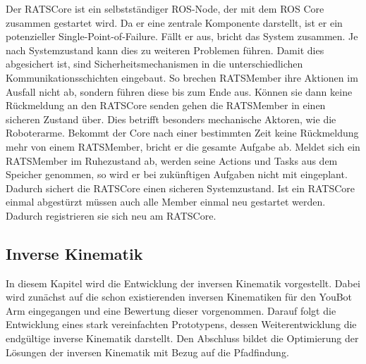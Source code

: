 Der RATSCore ist ein selbstständiger ROS-Node, der mit dem ROS Core zusammen gestartet wird. Da er eine zentrale Komponente darstellt, ist er ein potenzieller Single-Point-of-Failure. Fällt er aus, bricht das System zusammen. Je nach Systemzustand kann dies zu weiteren Problemen führen. Damit dies abgesichert ist, sind Sicherheitsmechanismen in die unterschiedlichen Kommunikationsschichten eingebaut. So brechen RATSMember ihre Aktionen im Ausfall nicht ab, sondern führen diese bis zum Ende aus. Können sie dann keine Rückmeldung an den RATSCore senden gehen die RATSMember in einen sicheren Zustand über. Dies betrifft besonders mechanische Aktoren, wie die Roboterarme. Bekommt der Core nach einer bestimmten Zeit keine Rückmeldung mehr von einem RATSMember, bricht er die gesamte Aufgabe ab. Meldet sich ein RATSMember im Ruhezustand ab, werden seine Actions und Tasks aus dem Speicher genommen, so wird er bei zukünftigen Aufgaben nicht mit eingeplant. Dadurch sichert die RATSCore einen sicheren Systemzustand. Ist ein RATSCore einmal abgestürzt müssen auch alle Member einmal neu gestartet werden. Dadurch registrieren sie sich neu am RATSCore.

\subsection{Inverse Kinematik}
In diesem Kapitel wird die Entwicklung der inversen Kinematik vorgestellt. Dabei wird zunächst auf die schon existierenden inversen Kinematiken für den YouBot Arm eingegangen und eine Bewertung dieser vorgenommen. Darauf folgt die Entwicklung eines stark vereinfachten Prototypens, dessen Weiterentwicklung die endgültige inverse Kinematik darstellt. Den Abschluss bildet die Optimierung der Lösungen der inversen Kinematik mit Bezug auf die Pfadfindung.

